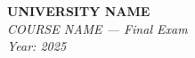 \documentclass[12pt]{article}
\begin{document}
\begin{center}
  \Large\textbf{UNIVERSITY NAME} \\[1em]
  \large\textit{COURSE NAME — Final Exam} \\[0.5em]
  \large\textit{Year: 2025} \\[2em]
\end{center}

\vspace{0.5cm}

\section{}

\begin{answerbox}
\end{answerbox}

\section{}

\begin{answerbox}
\end{answerbox}

\section{}

\begin{answerbox}
\end{answerbox}

\end{document}
